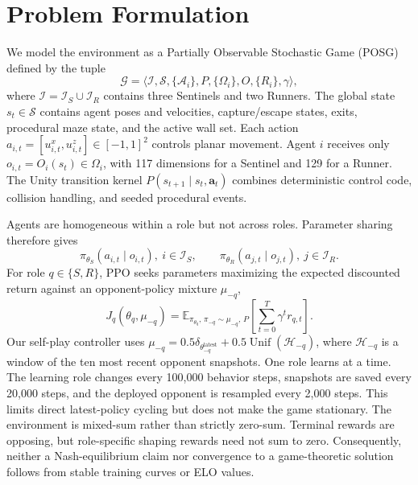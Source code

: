 \documentclass[journal]{IEEEtran}
\begin{document}
\section{Problem Formulation}

We model the environment as a Partially Observable Stochastic Game (POSG) defined by the tuple
\begin{equation}
\mathcal{G}=\langle \mathcal{I},\mathcal{S},\{\mathcal{A}_i\},P,\{\Omega_i\},O,\{R_i\},\gamma\rangle,
\end{equation}
where $\mathcal{I}=\mathcal{I}_S\cup\mathcal{I}_R$ contains three Sentinels and two Runners. The global state $s_t\in\mathcal{S}$ contains agent poses and velocities, capture/escape states, exits, procedural maze state, and the active wall set. Each action $a_{i,t}=[u_{i,t}^{x},u_{i,t}^{z}]\in[-1,1]^2$ controls planar movement. Agent $i$ receives only $o_{i,t}=O_i(s_t)\in\Omega_i$, with 117 dimensions for a Sentinel and 129 for a Runner. The Unity transition kernel $P(s_{t+1}\mid s_t,\mathbf{a}_t)$ combines deterministic control code, collision handling, and seeded procedural events.

Agents are homogeneous within a role but not across roles. Parameter sharing therefore gives
\begin{equation}
\pi_{\theta_S}(a_{i,t}\mid o_{i,t}),\ i\in\mathcal{I}_S,\qquad
\pi_{\theta_R}(a_{j,t}\mid o_{j,t}),\ j\in\mathcal{I}_R.
\end{equation}
For role $q\in\{S,R\}$, PPO seeks parameters maximizing the expected discounted return against an opponent-policy mixture $\mu_{-q}$,
\begin{equation}
J_q(\theta_q,\mu_{-q})=
\mathbb{E}_{\pi_{\theta_q},\,\pi_{-q}\sim\mu_{-q},\,P}
\left[\sum_{t=0}^{T}\gamma^t r_{q,t}\right].
\end{equation}
Our self-play controller uses $\mu_{-q}=0.5\delta_{\theta_{-q}^{\mathrm{latest}}}+0.5\operatorname{Unif}(\mathcal{H}_{-q})$, where $\mathcal{H}_{-q}$ is a window of the ten most recent opponent snapshots. One role learns at a time. The learning role changes every 100,000 behavior steps, snapshots are saved every 20,000 steps, and the deployed opponent is resampled every 2,000 steps. This limits direct latest-policy cycling but does not make the game stationary. The environment is mixed-sum rather than strictly zero-sum. Terminal rewards are opposing, but role-specific shaping rewards need not sum to zero. Consequently, neither a Nash-equilibrium claim nor convergence to a game-theoretic solution follows from stable training curves or ELO values.
\end{document}
